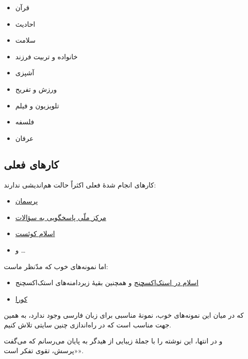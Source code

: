 \documentclass[]{article}
\begin{document}
\begin{itemize}
\itemsep1pt\parskip0pt
\item
  قرآن
\item
  احادیث
\item
  سلامت
\item
  خانواده و تربیت فرزند
\item
  آشپزی
\item
  ورزش و تفریح
\item
  تلویزیون و فیلم
\item
  فلسفه
\item
  عرفان
\end{itemize}

\subsection{کارهای
فعلی}\label{ux6a9ux627ux631ux647ux627ux6cc-ux641ux639ux644ux6cc}

کارهای انجام شدهٔ فعلی اکثراً حالت هم‌اندیشی ندارند:

\begin{itemize}
\itemsep1pt\parskip0pt
\item
  \href{http://porseman.org/}{پرسمان}
\item
  \href{http://www.pasokhgoo.ir/}{مرکز ملّی پاسخگویی به سؤالات}
\item
  \href{http://www.islamquest.net/}{اسلام کوئست}
\item
  و \ldots{}
\end{itemize}

اما نمونه‌های خوب که مدّنظر ماست:

\begin{itemize}
\itemsep1pt\parskip0pt
\item
  \href{http://islam.stackexchange.com}{اسلام در استک‌اکسچنج} و همچنین
  بقیهٔ زیردامنه‌های استک‌اکسچنج
\item
  \href{http://www.quora.com/}{کورا}
\end{itemize}

که در میان این نمونه‌های خوب، نمونهٔ مناسبی برای زبان فارسی وجود ندارد،
به همین جهت مناسب است که در راه‌اندازی چنین سایتی تلاش کنیم.

و در انتها، این نوشته را با جملهٔ زیبایی از هیدگر به پایان می‌رسانم که
می‌گفت «پرسش، تقوی تفکر است».
\end{document}
